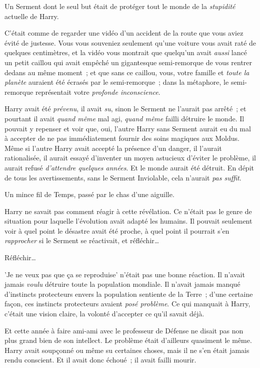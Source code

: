 Un Serment dont le seul but était de protéger tout le monde de la \emph{stupidité} actuelle de Harry.

C'était comme de regarder une vidéo d'un accident de la route que vous aviez évité de justesse. Vous vous souveniez seulement qu'une voiture vous avait raté de quelques centimètres, et la vidéo vous montrait que quelqu'un avait \emph{aussi} lancé un petit caillou qui avait empêché un gigantesque semi-remorque de vous rentrer dedans au même moment~; et que sans ce caillou, vous, votre famille et \emph{toute la planète} auraient été écrasés par le semi-remorque~; dans la métaphore, le semi-remorque représentait votre \emph{profonde inconscience}.

Harry avait été \emph{prévenu}, il avait \emph{su}, sinon le Serment ne l'aurait pas arrêté~; et pourtant il avait \emph{quand même} mal agi, \emph{quand même} failli détruire le monde. Il pouvait y repenser et voir que, oui, l'autre Harry sans Serment aurait eu du mal à accepter de ne pas immédiatement fournir des soins magiques aux Moldus. Même si l'autre Harry avait accepté la présence d'un danger, il l'aurait rationalisée, il aurait essayé d'inventer un moyen astucieux d'éviter le problème, il aurait refusé \emph{d'attendre quelques années}. Et le monde aurait été détruit. En dépit de tous les avertissements, sans le Serment Inviolable, cela n'aurait \emph{pas suffit}.

Un mince fil de Temps, passé par le chas d'une aiguille.

Harry ne savait pas comment réagir à cette révélation. Ce n'était pas le genre de situation pour laquelle l'évolution avait adapté les humains. Il pouvait seulement voir à quel point le désastre avait été proche, à quel point il pourrait s'en \emph{rapprocher} si le Serment se réactivait, et réfléchir…

Réfléchir…

'Je ne veux pas que ça se reproduise' n'était pas une bonne réaction. Il n'avait jamais \emph{voulu} détruire toute la population mondiale. Il n'avait jamais manqué d'instincts protecteurs envers la population sentiente de la Terre~; d'une certaine façon, ces instincts protecteurs avaient \emph{posé problème}. Ce qui manquait à Harry, c'était une vision claire, la volonté d'accepter ce qu'il savait déjà.

Et cette année à faire ami-ami avec le professeur de Défense ne disait pas non plus grand bien de son intellect. Le problème était d'ailleurs quasiment le même. Harry avait soupçonné ou même su certaines choses, mais il ne s'en était jamais rendu conscient. Et il avait donc échoué~; il avait failli mourir.


